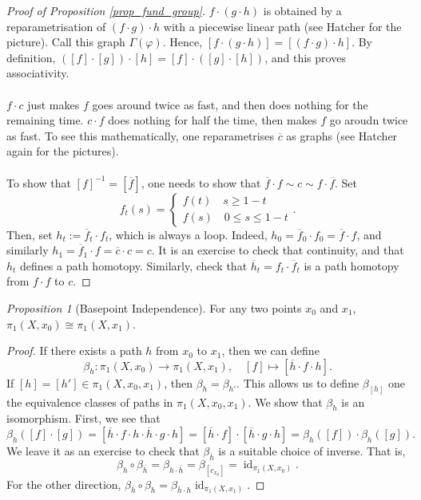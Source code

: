 \documentclass[a4paper]{report}
\theoremstyle{definition}
\theoremstyle{remark}
\theoremstyle{proposition}
\newtheorem{proposition}{Proposition}
\theoremstyle{conjecture}
\theoremstyle{lemma}
\theoremstyle{corollary}
\theoremstyle{exercise}
\newcommand{\on}{\operatorname}
\begin{document}
\begin{proof}[Proof of Proposition \ref{prop_fund_group}]
    $f \cdot (g\cdot h)$ is obtained by a reparametrisation of 
    $(f\cdot g)\cdot h$ with a piecewise linear path (see Hatcher for the 
    picture). Call this graph $\Gamma(\varphi)$. Hence, 
    $[f\cdot (g\cdot h)] = [(f\cdot g)\cdot h]$. By definition,
    $([f] \cdot [g])\cdot [h] = [f] \cdot ([g] \cdot [h])$, 
    and this proves associativity.\\\\
    $f \cdot c$ just makes $f$ goes around twice as fast, and then does 
    nothing for the remaining time. $c\cdot f$ does nothing for half the time,
    then makes $f$ go aroudn twice as fast. To see this mathematically, 
    one reparametrises $\overline{c}$ as graphs (see Hatcher again for the 
    pictures).\\\\
    To show that $[f]^{-1} = [\overline{f}]$, one needs to show that 
    $\overline{f} \cdot f \sim c \sim f\cdot \overline{f}$. Set 
    $$f_t(s) = \begin{cases}
        f(t) \quad s \geq 1-t\\
        f(s) \quad 0\leq s \leq 1-t
    \end{cases}.$$
    Then, set $h_t := \overline{f}_t \cdot f_t$, which is always a loop.
    Indeed, $h_0 = \overline{f}_0 \cdot f_0 = \overline{f}\cdot f$,
    and similarly $h_1 = \overline{f}_1 \cdot f = \overline{c} \cdot c = c$.
    It is an exercise to check that continuity, and that $h_t$ defines a path 
    homotopy. Similarly, check that $\overline{h}_t = f_t \cdot \overline{f}_t$
    is a path homotopy from $f\cdot f$ to $c$.
\end{proof}

\begin{proposition}[Basepoint Independence]
    For any two points $x_0$ and $x_1$, $\pi_1(X,x_0) \cong \pi_1(X,x_1)$.
\end{proposition}


\begin{proof}
    If there exists a path $h$ from $x_0$ to $x_1$, then 
    we can define $$\beta_h : \pi_1(X,x_0) \longrightarrow \pi_1(X,x_1),\quad [f] \longmapsto [\overline{h}\cdot f \cdot h].$$
    If $[h] = [h'] \in \pi_1(X,x_0,x_1)$, then 
    $\beta_h = \beta_{h'}$. This allows us to define $\beta_{[h]}$ one the 
    equivalence classes of paths in $\pi_1(X,x_0,x_1)$.
    We show that $\beta_h$ is an isomorphism. 
    First, we see that 
    $$\beta_h ([f] \cdot [g]) = [\overline{h}\cdot f \cdot h\cdot \overline{h} \cdot g \cdot h] = [\overline{h} \cdot f] \cdot [\overline{h} \cdot g \cdot h] = \beta_h([f]) \cdot \beta_h([g]).$$
    We leave it as an exercise to check that 
    $\beta_{\overline{h}}$ is a suitable choice of inverse. That is,
    $$\beta_h \circ \beta_{\overline{h}} = \beta_{h\cdot \overline{h}} = \beta_{[c_{x_0}]} = \on{id}_{\pi_1(X,x_0)}.$$ 
    For the other direction, 
    $\beta_{\overline{h}} \circ \beta_h = \beta_{\overline{h}\cdot h}\on{id}_{\pi_1(X,x_1)}$.
\end{proof}
\end{document}
